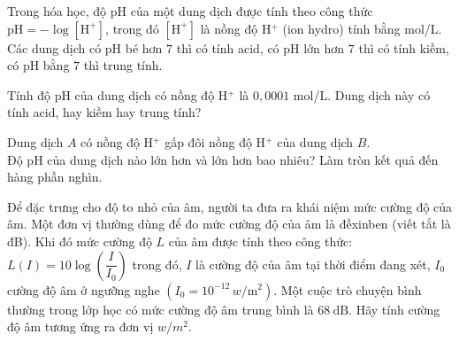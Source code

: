 \begin{vd}%
	Trong hóa học, độ  pH  của một dung dịch được tính theo công thức $\text{pH}=-\log[\text{H}^+] $, trong đó $ [\text{H}^+] $ là nồng độ  H$^+ $ (ion hydro) tính bằng mol/L. Các dung dịch có  pH  bé hơn $ 7 $ thì có tính acid, có pH  lớn hơn $ 7 $ thì có tính kiềm, có  pH  bằng $ 7 $ thì trung tính.
	\begin{listEX}[1]
		\item[a)] Tính độ  pH  của dung dịch có nồng độ H$^+ $ là $ 0{,}0001 $ mol/L. Dung dịch này có tính acid, hay kiềm hay trung tính?
		\item[b)] Dung dịch $ A $ có nồng độ  H$^+ $ gấp đôi nồng độ  H$^+ $ của dung dịch $ B $.\\
		Độ pH  của dung dịch nào lớn hơn và lớn hơn bao nhiêu? Làm tròn kết quả đến hàng phần nghìn.
	\end{listEX}
\end{vd} 

\begin{vd}
	Để đặc trưng cho độ to nhỏ của âm, người ta đưa ra khái niệm mức cường độ của âm. Một đơn vị thường dùng để đo mức cường độ của âm là đềxinben (viết tắt là đB). Khi đó mức cường độ $L$ của âm được tính theo công thức: $L(I)=10 \log \left( \dfrac{I}{I_0}\right) $ trong đó, $I$ là cường độ của âm tại thời điểm đang xét, $I_0$ cường độ âm ở ngưỡng nghe $\left(I_0=10^{-12}\, w / \mathrm{m}^2\right)$. Một cuộc trò chuyện bình thường trong lớp học có mức cường độ âm trung bình là $68 \mathrm{~dB}$. Hãy tính cường độ âm tương ứng ra đơn vị $w / m^2$.
\end{vd} 

